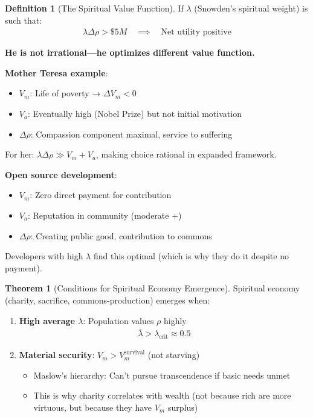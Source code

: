 \documentclass[11pt,a4paper]{article}
\theoremstyle{definition}
\newtheorem{definition}{Definition}[section]
\newtheorem{theorem}{Theorem}[section]
\theoremstyle{remark}
\begin{document}
\begin{small}
\begin{enumerate}
\begin{definition}[The Spiritual Value Function]
If \(\lambda\) (Snowden's spiritual weight) is such that:
\begin{align}
\lambda \Delta\rho > \$5M \quad \implies \quad \text{Net utility positive}
\end{align}

\textbf{He is not irrational—he optimizes different value function.}

\textbf{Mother Teresa example}:
\begin{itemize}
    \item \(V_m\): Life of poverty → \(\Delta V_m < 0\)
    \item \(V_a\): Eventually high (Nobel Prize) but not initial motivation
    \item \(\Delta\rho\): Compassion component maximal, service to suffering
\end{itemize}

For her: \(\lambda \Delta\rho \gg V_m + V_a\), making choice rational in expanded framework.

\textbf{Open source development}:
\begin{itemize}
    \item \(V_m\): Zero direct payment for contribution
    \item \(V_a\): Reputation in community (moderate \(+\))
    \item \(\Delta\rho\): Creating public good, contribution to commons
\end{itemize}

Developers with high \(\lambda\) find this optimal (which is why they do it despite no payment).
\end{definition}

\begin{theorem}[Conditions for Spiritual Economy Emergence]
Spiritual economy (charity, sacrifice, commons-production) emerges when:

\begin{enumerate}
    \item \textbf{High average \(\lambda\)}: Population values \(\rho\) highly
        \begin{align}
        \bar{\lambda} > \lambda_{\text{crit}} \approx 0.5
        \end{align}
    
    \item \textbf{Material security}: \(V_m > V_m^{\text{survival}}\) (not starving)
        \begin{itemize}
            \item Maslow's hierarchy: Can't pursue transcendence if basic needs unmet
            \item This is why charity correlates with wealth (not because rich are more virtuous, but because they have \(V_m\) surplus)
        \end{itemize}
    

\end{enumerate}
\end{theorem}
\end{enumerate}
\end{small}
\end{document}
